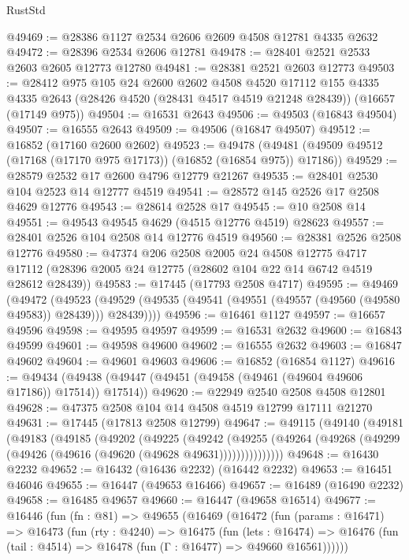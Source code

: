 \begin{lexlean}{RustStd}
\begin{coremodule}
{\begin{coremodule}
{{{{{{{{{{{{{{{{{{{{{{{{{{{{{{{{{{{{{{{{{{{{{{{{{{{{{{{@49469 := @28386 @1127 @2534 @2606 @2609 @4508 @12781 @4335 @2632
@49472 := @28396 @2534 @2606 @12781
@49478 := @28401 @2521 @2533 @2603 @2605 @12773 @12780
@49481 := @28381 @2521 @2603 @12773
@49503 := @28412
    @975
    @105
    @24
    @2600
    @2602
    @4508
    @4520
    @17112
    @155
    @4335
    @4335
    @2643
    (@28426 @4520 (@28431 @4517 @4519 @21248 @28439))
    (@16657 (@17149 @975))
@49504 := @16531 @2643
@49506 := @49503 (@16843 @49504)
@49507 := @16555 @2643
@49509 := @49506 (@16847 @49507)
@49512 := @16852 (@17160 @2600 @2602)
@49523 := @49478
    (@49481 (@49509 @49512 (@17168 (@17170 @975 @17173)) (@16852 (@16854 @975)) @17186))
@49529 := @28579 @2532 @17 @2600 @4796 @12779 @21267
@49535 := @28401 @2530 @104 @2523 @14 @12777 @4519
@49541 := @28572 @145 @2526 @17 @2508 @4629 @12776
@49543 := @28614 @2528 @17
@49545 := @10 @2508 @14
@49551 := @49543 @49545 @4629 (@4515 @12776 @4519) @28623
@49557 := @28401 @2526 @104 @2508 @14 @12776 @4519
@49560 := @28381 @2526 @2508 @12776
@49580 := @47374
    @206
    @2508
    @2005
    @24
    @4508
    @12775
    @4717
    @17112
    (@28396 @2005 @24 @12775 (@28602 @104 @22 @14 @6742 @4519 @28612 @28439))
@49583 := @17445 (@17793 @2508 @4717)
@49595 := @49469
    (@49472
      (@49523 (@49529 (@49535 (@49541 (@49551 (@49557 (@49560 (@49580 @49583)) @28439))) @28439))))
@49596 := @16461 @1127
@49597 := @16657 @49596
@49598 := @49595 @49597
@49599 := @16531 @2632
@49600 := @16843 @49599
@49601 := @49598 @49600
@49602 := @16555 @2632
@49603 := @16847 @49602
@49604 := @49601 @49603
@49606 := @16852 (@16854 @1127)
@49616 := @49434 (@49438 (@49447 (@49451 (@49458 (@49461 (@49604 @49606 @17186)) @17514)) @17514))
@49620 := @22949 @2540 @2508 @4508 @12801
@49628 := @47375 @2508 @104 @14 @4508 @4519 @12799 @17111 @21270
@49631 := @17445 (@17813 @2508 @12799)
@49647 := @49115
    (@49140
      (@49181
        (@49183
          (@49185
            (@49202
              (@49225
                (@49242
                  (@49255
                    (@49264 (@49268 (@49299 (@49426 (@49616 (@49620 (@49628 @49631)))))))))))))))
@49648 := @16430 @2232
@49652 := @16432 (@16436 @2232) (@16442 @2232)
@49653 := @16451 @46046
@49655 := @16447 (@49653 @16466)
@49657 := @16489 (@16490 @2232)
@49658 := @16485 @49657
@49660 := @16447 (@49658 @16514)
@49677 := @16446
    (fun (fn : @81) =>
    @49655
      (@16469
        (@16472
          (fun (params : @16471) =>
          @16473
            (fun (rty : @4240) =>
            @16475
              (fun (lets : @16474) =>
              @16476 (fun (tail : @4514) => @16478 (fun (Γ : @16477) => @49660 @16561))))))
}}}}}}}}}}}}}}}}}}}}}}}}}}}}}}}}}}}}}}}}}}}}}}}}}}}}}}}
\end{coremodule}}
\end{coremodule}
\end{lexlean}
